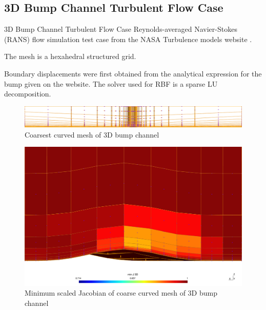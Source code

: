 \documentclass[t,12pt]{beamer}
\begin{document}
\subsection{3D Bump Channel Turbulent Flow Case}
\begin{frame}{3D Bump Channel Turbulent Flow Case}
Reynolds-averaged Navier-Stokes (RANS) flow simulation test case from the NASA Turbulence models website \cite{case:bump3d}.

The mesh is a hexahedral structured grid.

Boundary displacements were first obtained from the analytical expression for the bump given on the website. The solver used for RBF is a sparse LU decomposition.
\begin{figure}
	\centering
	\includegraphics[scale=0.2]{bump3d-vcoarse2}
	\caption{Coarsest curved mesh of 3D bump channel}
	\label{fig:bump3d}
\end{figure}
\end{frame}

\begin{frame}
	\begin{figure}
		\centering
		\includegraphics[scale=0.2]{bump3d-vcoarse-quality}
		\caption{Minimum scaled Jacobian of coarse curved mesh of 3D bump channel}
		\label{fig:bump3d-coarse-jac}
	\end{figure}
\end{frame}
\end{document}
